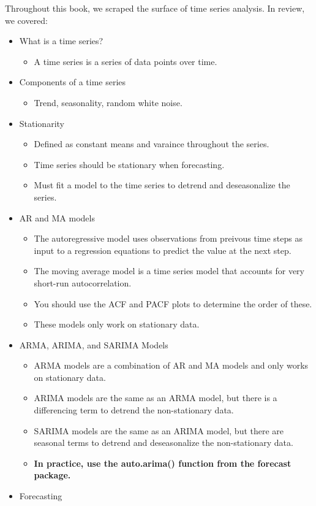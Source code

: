 \documentclass[
]{book}
\providecommand{\tightlist}{%
  \setlength{\itemsep}{0pt}\setlength{\parskip}{0pt}}
\begin{document}
Throughout this book, we scraped the surface of time series analysis. In review, we covered:

\begin{itemize}
\tightlist
\item
  What is a time series?

  \begin{itemize}
  \tightlist
  \item
    A time series is a series of data points over time.
  \end{itemize}
\item
  Components of a time series

  \begin{itemize}
  \tightlist
  \item
    Trend, seasonality, random white noise.
  \end{itemize}
\item
  Stationarity

  \begin{itemize}
  \tightlist
  \item
    Defined as constant means and varaince throughout the series.
  \item
    Time series should be stationary when forecasting.
  \item
    Must fit a model to the time series to detrend and deseasonalize the series.
  \end{itemize}
\item
  AR and MA models

  \begin{itemize}
  \tightlist
  \item
    The autoregressive model uses observations from preivous time steps as input to a regression equations to predict the value at the next step.
  \item
    The moving average model is a time series model that accounts for very short-run autocorrelation.
  \item
    You should use the ACF and PACF plots to determine the order of these.
  \item
    These models only work on stationary data.
  \end{itemize}
\item
  ARMA, ARIMA, and SARIMA Models

  \begin{itemize}
  \tightlist
  \item
    ARMA models are a combination of AR and MA models and only works on stationary data.
  \item
    ARIMA models are the same as an ARMA model, but there is a differencing term to detrend the non-stationary data.
  \item
    SARIMA models are the same as an ARIMA model, but there are seasonal terms to detrend and deseasonalize the non-stationary data.
  \item
    \textbf{In practice, use the auto.arima() function from the forecast package.}
  \end{itemize}
\item
  Forecasting


\end{itemize}
\end{document}
